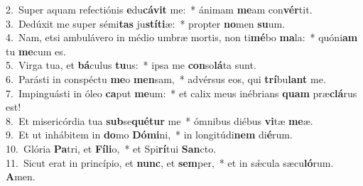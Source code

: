 {2.~}Super aquam refectiónis \textbf{e}du\textbf{cá}\textbf{vit} me:~* ánimam \textbf{me}am con\textbf{vér}tit.\\
{3.~}Dedúxit me super sémi\textbf{tas} ju\textbf{stí}\textbf{ti}æ:~* propter \textbf{no}men \textbf{su}um.\\
{4.~}Nam, etsi ambulávero in médio umbræ mortis, non ti\textbf{mé}bo \textbf{ma}la:~* quóni\textbf{am} tu \textbf{me}cum es.\\
{5.~}Virga tua, et \textbf{bá}culus \textbf{tu}us:~* ipsa me \textbf{con}so\textbf{lá}ta sunt.\\
{6.~}Parásti in conspéctu \textbf{me}o \textbf{men}sam,~* advérsus eos, qui \textbf{trí}bu\textbf{lant} me.\\
{7.~}Impinguásti in óleo \textbf{ca}put \textbf{me}um:~* et calix meus inébrians \textbf{quam} præ\textbf{clá}rus est!\\
{8.~}Et misericórdia tua \textbf{sub}se\textbf{qué}\textbf{tur} me~* ómnibus diébus \textbf{vi}tæ \textbf{me}æ.\\
{9.~}Et ut inhábitem in \textbf{do}mo \textbf{Dó}\textbf{mi}ni,~* in longitúdi\textbf{nem} di\textbf{é}rum.\\
{10.~}Glória \textbf{Pa}tri, et \textbf{Fí}\textbf{li}o,~* et Spi\textbf{rí}tui \textbf{San}cto.\\
{11.~}Sicut erat in princípio, et \textbf{nunc}, et \textbf{sem}per,~* et in sǽcula sæcu\textbf{ló}rum. \textbf{A}men.\\
